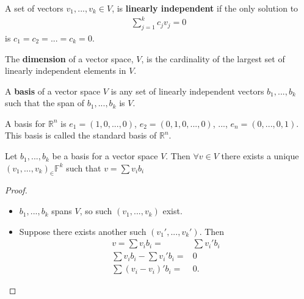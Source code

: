 \documentclass[compress]{beamer}
\def\F{\mathbb{F}}
\def\R{\mathbb{R}}
\begin{document}
\begin{frame}
  \begin{definition}
    A set of vectors $v_1, ..., v_k \in V$, is \textbf{linearly
      independent} if the only solution to
    \begin{align*}
      \sum_{j=1}^k c_j v_j = 0 
    \end{align*}
    is $c_1 = c_2 = ... = c_k = 0$. 
  \end{definition}
  
  \begin{definition}
    The \textbf{dimension} of a vector space, $V$, is the cardinality of
    the largest set of linearly independent elements in $V$.
  \end{definition} 
  
  \begin{definition}
    A \textbf{basis} of a vector space $V$ is any set of linearly
    independent vectors $b_1, ..., b_k$ such that the span of $b_1, ...,
    b_k$ is $V$.
  \end{definition}
\end{frame}

\begin{frame}
  \begin{example}
    A basis for $\R^n$ is $e_1 = (1, 0, ..., 0 )$, $e_2 = (0, 1, 0, ...,
    0)$, $...$, $e_n = (0, ... , 0 , 1)$. This basis is called the
    standard basis of $\R^n$. 
  \end{example}
\end{frame}

\begin{frame}
  \begin{lemma}
    Let $b_1, ... , b_k$ be a basis for a vector space $V$. Then
    $\forall v \in V$ there exists a unique $(v_1, ..., v_k)_ \in \F^k$
    such that $ v = \sum v_i b_i$  
  \end{lemma}
  \begin{proof}
    \begin{itemize}
    \item $b_1, ..., b_k$ spans $V$, so such $(v_1, ..., v_k)$ exist. 
    \item Suppose there exists another such $(v_1', ..., v_k')$. Then
      \begin{align*}
        v = \sum v_i b_i = & \sum v_i' b_i \\
        \sum v_i b_i - \sum v_i'b_i = & 0 \\
        \sum (v_i - v_i)' b_i = & 0.
      \end{align*}
    \end{itemize}
  \end{proof}
\end{frame}
\end{document}
